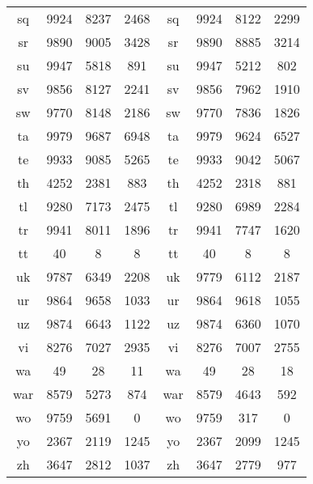 \begin{figure}[h]
\begin{tabular}{cccc|cccc}
sq&9924&8237&2468&	sq&9924&8122&2299\\
sr&9890&9005&3428&	sr&9890&8885&3214\\
su&9947&5818&891&	su&9947&5212&802\\
sv&9856&8127&2241&	sv&9856&7962&1910\\
sw&9770&8148&2186&	sw&9770&7836&1826\\
ta&9979&9687&6948&	ta&9979&9624&6527\\
te&9933&9085&5265&	te&9933&9042&5067\\
th&4252&2381&883&	th&4252&2318&881\\
tl&9280&7173&2475&	tl&9280&6989&2284\\
tr&9941&8011&1896&	tr&9941&7747&1620\\
tt&40&8&8&	tt&40&8&8\\
uk&9787&6349&2208&	uk&9779&6112&2187\\
ur&9864&9658&1033&	ur&9864&9618&1055\\
uz&9874&6643&1122&	uz&9874&6360&1070\\
vi&8276&7027&2935&	vi&8276&7007&2755\\
wa&49&28&11&	wa&49&28&18\\
war&8579&5273&874&	war&8579&4643&592\\
wo&9759&5691&0&	wo&9759&317&0\\
yo&2367&2119&1245&	yo&2367&2099&1245\\
zh&3647&2812&1037&	zh&3647&2779&977\\
\hline\hline
\end{tabular}
\end{figure}
	
